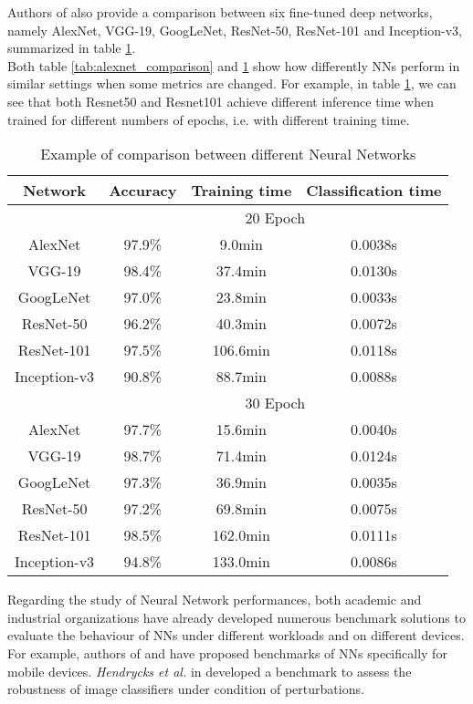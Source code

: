 Authors of \cite{suh_transfer_2018} also provide a comparison between six fine-tuned deep networks, namely AlexNet, VGG-19, GoogLeNet, ResNet-50, ResNet-101 and Inception-v3, summarized in table \ref{tab:models_ex_comp}.\\
Both table \ref{tab:alexnet_comparison} and \ref{tab:models_ex_comp} show how differently NNs perform in similar settings when some metrics are changed. For example, in table \ref{tab:models_ex_comp}, we can see that both Resnet50 and Resnet101 achieve different inference time when trained for different numbers of epochs, i.e. with different training time.\\
\begin{table}[h]
\centering
\begin{tabular}{|c| ccc|}
  \hline
 Network &Accuracy& Training time   &Classification time   \\
 \hline
 &\multicolumn{3}{c|}{20 Epoch}\\
 \hline
AlexNet &97.9\%& 9.0min   &0.0038s    \\
VGG-19 &98.4\%& 37.4min   &0.0130s  \\
GoogLeNet &97.0\%& 23.8min  &0.0033s \\
ResNet-50 &96.2\%& 40.3min  &0.0072s\\
ResNet-101 &97.5\%& 106.6min   &0.0118s \\
Inception-v3 &90.8\%& 88.7min &0.0088s \\
\hline
&\multicolumn{3}{c|}{30 Epoch}\\
\hline
AlexNet & 97.7\% &15.6min &0.0040s     \\
VGG-19 &98.7\% &71.4min&0.0124s  \\
GoogLeNet  &97.3\% &36.9min& 0.0035s     \\
ResNet-50 & 97.2\% &69.8min&0.0075s      \\
ResNet-101 & 98.5\% &162.0min&   0.0111s   \\
Inception-v3 & 94.8\% &133.0min   & 0.0086s  \\
\hline
\end{tabular}
\caption[Example of comparison between different Neural Networks]{Example of comparison between different Neural Networks \cite{suh_transfer_2018}}
 \label{tab:models_ex_comp}
\end{table}
Regarding the study of Neural Network performances, both academic and industrial organizations have already developed numerous benchmark solutions to evaluate the behaviour of NNs under different workloads and on different devices. For example, authors of \cite{luo2020comparison} and \cite{ignatov2019ai} have proposed benchmarks of NNs specifically for mobile devices. \textit{Hendrycks et al.} in  \cite{hendrycks2019benchmarking} developed a benchmark to assess the robustness of image classifiers under condition of perturbations. \\

